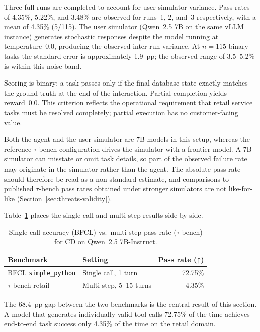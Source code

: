 Three full runs are completed to account for user simulator variance.
Pass rates of 4.35\%, 5.22\%, and 3.48\% are observed for runs~1, 2,
and~3 respectively, with a mean of 4.35\% (5/115). The user simulator
(Qwen~2.5 7B on the same vLLM instance) generates stochastic responses
despite the model running at temperature~0.0, producing the observed
inter-run variance. At $n=115$ binary tasks the standard error is
approximately 1.9~pp; the observed range of 3.5--5.2\% is within this
noise band.

Scoring is binary: a task passes only if the final database state exactly
matches the ground truth at the end of the interaction. Partial completion
yields reward~0.0. This criterion reflects the operational requirement
that retail service tasks must be resolved completely; partial execution
has no customer-facing value.

Both the agent and the user simulator are 7B models in this setup,
whereas the reference $\tau$-bench configuration drives the simulator
with a frontier model. A 7B simulator can misstate or omit task
details, so part of the observed failure rate may originate in the
simulator rather than the agent. The absolute pass rate should
therefore be read as a non-standard estimate, and comparisons to
published $\tau$-bench pass rates obtained under stronger simulators
are not like-for-like (Section~\ref{sec:threats-validity}).

Table~\ref{tab:bfcl-vs-tau} places the single-call and multi-step results
side by side.

\begin{table}[ht]
\centering
\caption{Single-call accuracy (BFCL) vs.\ multi-step pass rate
         ($\tau$-bench) for CD on Qwen~2.5 7B-Instruct.}
\label{tab:bfcl-vs-tau}
\begin{tabular}{llr}
\toprule
Benchmark & Setting & Pass rate (↑) \\
\midrule
BFCL \texttt{simple\_python} & Single call, 1 turn     & 72.75\% \\
$\tau$-bench retail & Multi-step, 5--15 turns & 4.35\%  \\
\bottomrule
\end{tabular}
\end{table}

The 68.4~pp gap between the two benchmarks is the central result of this
section. A model that generates individually valid tool calls 72.75\% of
the time achieves end-to-end task success only 4.35\% of the time on the
retail domain.

